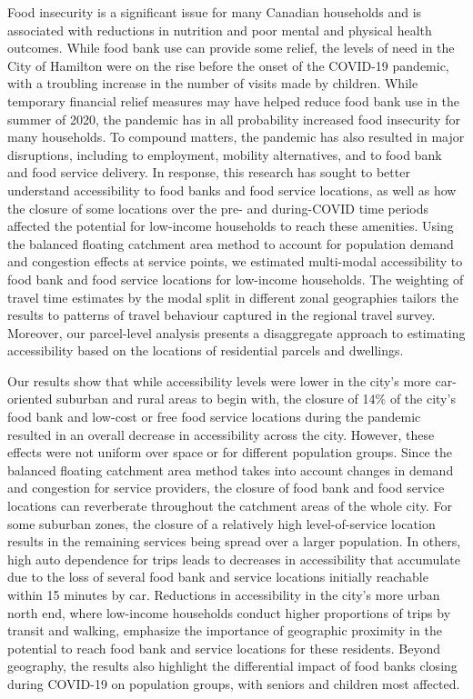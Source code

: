 \documentclass[]{elsarticle} %
\begin{document}
Food insecurity is a significant issue for many Canadian households and
is associated with reductions in nutrition and poor mental and physical
health outcomes. While food bank use can provide some relief, the levels
of need in the City of Hamilton were on the rise before the onset of the
COVID-19 pandemic, with a troubling increase in the number of visits
made by children. While temporary financial relief measures may have
helped reduce food bank use in the summer of 2020, the pandemic has in
all probability increased food insecurity for many households. To
compound matters, the pandemic has also resulted in major disruptions,
including to employment, mobility alternatives, and to food bank and
food service delivery. In response, this research has sought to better
understand accessibility to food banks and food service locations, as
well as how the closure of some locations over the pre- and during-COVID
time periods affected the potential for low-income households to reach
these amenities. Using the balanced floating catchment area method to
account for population demand and congestion effects at service points,
we estimated multi-modal accessibility to food bank and food service
locations for low-income households. The weighting of travel time
estimates by the modal split in different zonal geographies tailors the
results to patterns of travel behaviour captured in the regional travel
survey. Moreover, our parcel-level analysis presents a disaggregate
approach to estimating accessibility based on the locations of
residential parcels and dwellings.

Our results show that while accessibility levels were lower in the
city's more car-oriented suburban and rural areas to begin with, the
closure of 14\% of the city's food bank and low-cost or free food
service locations during the pandemic resulted in an overall decrease in
accessibility across the city. However, these effects were not uniform
over space or for different population groups. Since the balanced
floating catchment area method takes into account changes in demand and
congestion for service providers, the closure of food bank and food
service locations can reverberate throughout the catchment areas of the
whole city. For some suburban zones, the closure of a relatively high
level-of-service location results in the remaining services being spread
over a larger population. In others, high auto dependence for trips
leads to decreases in accessibility that accumulate due to the loss of
several food bank and service locations initially reachable within 15
minutes by car. Reductions in accessibility in the city's more urban
north end, where low-income households conduct higher proportions of
trips by transit and walking, emphasize the importance of geographic
proximity in the potential to reach food bank and service locations for
these residents. Beyond geography, the results also highlight the
differential impact of food banks closing during COVID-19 on population
groups, with seniors and children most affected.
\end{document}

